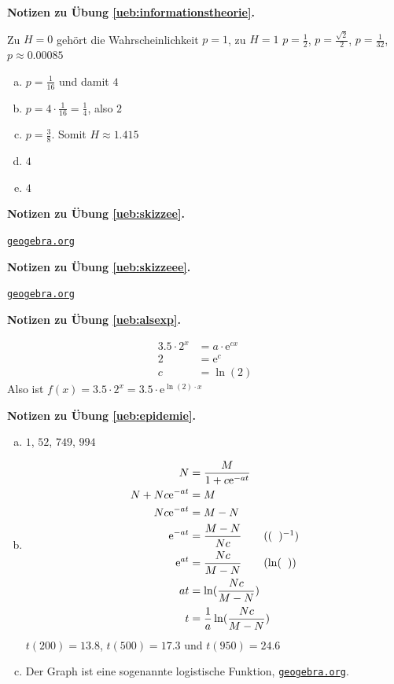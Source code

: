 \documentclass[%
11pt,%
twoside,%
titlepage,%
german,%
headsepline%
]{scrartcl}
\newcommand{\geogebralink}{\href{https://www.geogebra.org/calculator}{\texttt{geogebra.org}}}
\newcounter{theo}[section]\setcounter{theo}{0}
\newcommand{\concatueb}[1]{ueb:#1}%
\newcommand{\concatlsg}[1]{lsg:#1}%
\newenvironment{lsg}[1]{%
    \par\noindent\textbf{Notizen zu Übung \ref{\concatueb{#1}}.}%
    \label{\concatlsg{#1}}
}{%
    \par%
}
\begin{document}
\begin{lsg}{informationstheorie}
Zu $H=0$ gehört die Wahrscheinlichkeit $p=1$, zu $H=1$ $p=\frac{1}{2}$, $p=\frac{\sqrt{2}}{2}$, $p=\frac{1}{32}$, $p\approx0.00085$
    \begin{enumerate}[a)]
        \item $p=\frac{1}{16}$ und damit $4$
        \item $p=4\cdot\frac{1}{16}=\frac{1}{4}$, also $2$
        \item $p=\frac{3}{8}$. Somit $H\approx1.415$
        \item $4$
        \item $4$
    \end{enumerate}
\end{lsg}
\begin{lsg}{skizzee}
    \geogebralink
\end{lsg}
\begin{lsg}{skizzeee}
    \geogebralink
\end{lsg}
\begin{lsg}{alsexp}
    \begin{align*}
        3.5\cdot2^x &= a\cdot \mathrm{e}^{cx}\tag{$a=3.5$}\\
        2 &= \mathrm{e}^{c}\\
        c &= \ln(2)
    \end{align*}
    Also ist $f(x)=3.5\cdot2^x=3.5\cdot \mathrm{e}^{\ln(2)\cdot x}$
\end{lsg}
\begin{lsg}{epidemie}
    \begin{enumerate}[a)]
        \item $1$, $52$, $749$, $994$
        \item \begin{align*}
            N &= \frac{M}{1+c\mathrm{e}^{-at}}\\
            N + Nc\mathrm{e}^{-at} &= M\\
            Nc\mathrm{e}^{-at} &= M-N\\
            \mathrm{e}^{-at} &= \frac{M-N}{Nc}\tag{$(\phantom{x})^{-1}$}\\
            \mathrm{e}^{at} &= \frac{Nc}{M-N} \tag{$\ln(\phantom{x})$}\\
            at &= \ln(\frac{Nc}{M-N})\\
            t &= \frac{1}{a}\ln(\frac{Nc}{M-N})
        \end{align*}
        $t(200)=13.8$, $t(500)=17.3$ und $t(950)=24.6$
        \item Der Graph ist eine sogenannte logistische Funktion, \geogebralink.
    \end{enumerate}
\end{lsg}
\end{document}
